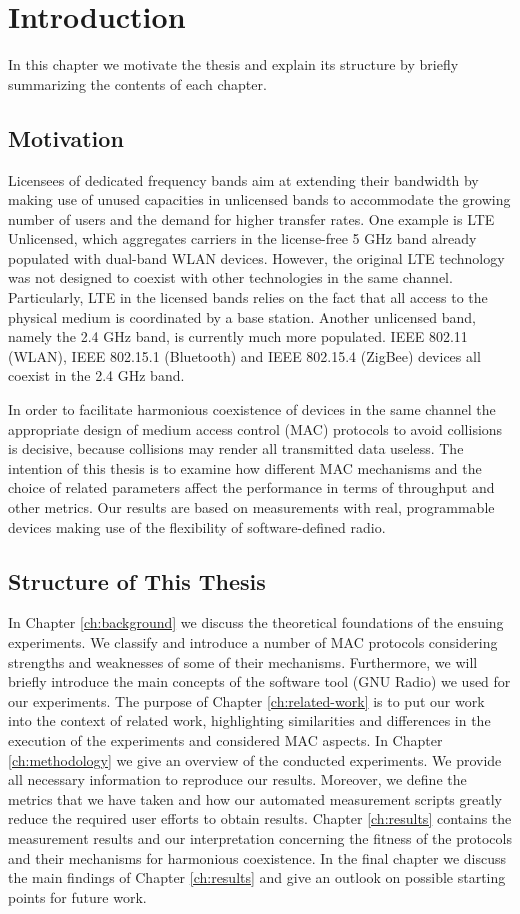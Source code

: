 \chapter{Introduction}
\label{ch:introduction}

In this chapter we motivate the thesis and explain its structure by briefly summarizing the contents of each chapter.

\section{Motivation}
Licensees of dedicated frequency bands aim at extending their bandwidth by making use of unused capacities in unlicensed bands to accommodate the growing number of users and the demand for higher transfer rates. One example is LTE Unlicensed, which aggregates carriers in the license-free 5 GHz band already populated with dual-band WLAN devices. However, the original LTE technology was not designed to coexist with other technologies in the same channel. Particularly, LTE in the licensed bands relies on the fact that all access to the physical medium is coordinated by a base station. Another unlicensed band, namely the 2.4 GHz band, is currently much more populated. IEEE 802.11 (WLAN), IEEE 802.15.1 (Bluetooth) and IEEE 802.15.4 (ZigBee) devices all coexist in the 2.4 GHz band.

In order to facilitate harmonious coexistence of devices in the same channel the appropriate design of medium access control (MAC) protocols to avoid collisions is decisive, because collisions may render all transmitted data useless. The intention of this thesis is to examine how different MAC mechanisms and the choice of related parameters affect the performance in terms of throughput and other metrics. Our results are based on measurements with real, programmable devices making use of the flexibility of software-defined radio.   

\section{Structure of This Thesis}
In Chapter \ref{ch:background} we discuss the theoretical foundations of the ensuing experiments. We classify and introduce a number of MAC protocols considering strengths and weaknesses of some of their mechanisms. Furthermore, we will briefly introduce the main concepts of the software tool (GNU Radio) we used for our experiments. The purpose of Chapter \ref{ch:related-work} is to put our work into the context of related work, highlighting similarities and differences in the execution of the experiments and considered MAC aspects.
In Chapter \ref{ch:methodology} we give an overview of the conducted experiments. We provide all necessary information to reproduce our results. Moreover, we define the metrics that we have taken and how our automated measurement scripts greatly reduce the required user efforts to obtain results.
Chapter \ref{ch:results} contains the measurement results and our interpretation concerning the fitness of the protocols and their mechanisms for harmonious coexistence. 
In the final chapter we discuss the main findings of Chapter \ref{ch:results} and give an outlook on possible starting points for future work.